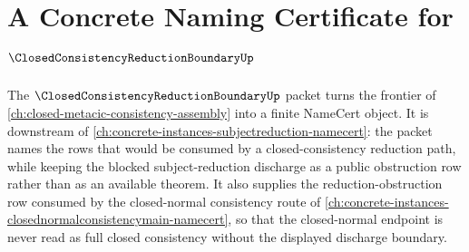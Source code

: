 \chapter{A Concrete Naming Certificate for $\ClosedConsistencyReductionBoundaryUp$}
\label{ch:concrete-instances-closed-consistency-reduction-boundary-namecert}

The $\ClosedConsistencyReductionBoundaryUp$ packet turns the frontier of
\autoref{ch:closed-metacic-consistency-assembly} into a finite NameCert object.
It is downstream of \autoref{ch:concrete-instances-subjectreduction-namecert}:
the packet names the rows that would be consumed by a closed-consistency
reduction path, while keeping the blocked subject-reduction discharge as a
public obstruction row rather than as an available theorem.
It also supplies the reduction-obstruction row consumed by the closed-normal
consistency route of
\autoref{ch:concrete-instances-closednormalconsistencymain-namecert}, so that
the closed-normal endpoint is never read as full closed consistency without the
displayed discharge boundary.

